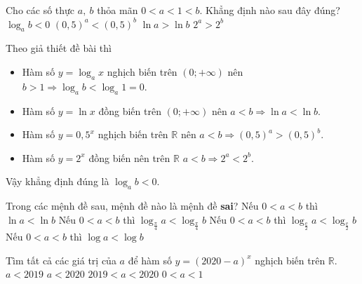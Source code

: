 \begin{ex}
	Cho các số thực $a,~b$ thỏa mãn $0<a<1<b$. Khẳng định nào sau đây đúng?
	\choice
	{\True $\log_a b<0$}
	{$(0{,}5)^a<(0{,}5)^b$}
	{$\ln a>\ln b$}
	{$2^a>2^b$}
	\loigiai
	{
		Theo giả thiết đề bài thì
		\begin{itemize}
			\item Hàm số $y=\log_a x$ nghịch biến trên $(0;+\infty)$ nên $b>1\Rightarrow\log_a b<\log_a1=0$.
			\item Hàm số $y=\ln x$ đồng biến trên $(0;+\infty)$ nên $a<b\Rightarrow\ln a <\ln b$.
			\item Hàm số $y=0{,5}^x$ nghịch biến trên $\mathbb{R}$ nên $a<b\Rightarrow(0{,}5)^a>(0{,}5)^b$.
			\item Hàm số $y=2^x$ đồng biến nên trên $\mathbb{R}$ $a<b\Rightarrow 2^a<2^b$.
		\end{itemize}
		Vậy khẳng định đúng là $\log_a b<0$.
	}
\end{ex}

\begin{ex}
	Trong các mệnh đề sau, mệnh đề nào là mệnh đề {\bf sai}?
	\choice
	{Nếu $0<a<b$ thì $\ln a<\ln b$}
	{\True Nếu $0<a<b$ thì $\log_{\tfrac{\pi}{4}} a<\log_{\tfrac{\pi}{4}}b$}
	{Nếu $0<a<b$ thì $\log_{\tfrac{\mathrm{e}}{2}} a<\log_{\tfrac{\mathrm{e}}{2}} b$}
	{Nếu $0<a<b$ thì $\log a<\log b$}
\end{ex}


\begin{ex}
	Tìm tất cả các giá trị của $a$ để hàm số $y = (2020 - a)^x$ nghịch biến trên $\mathbb{R}$.
	\choice
	{$ a<2019$}
	{$ a<2020 $}
	{\True $2019 < a < 2020 $}
	{$ 0<a<1 $}
\end{ex}


